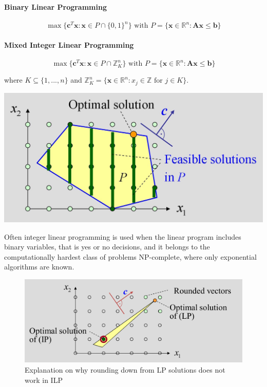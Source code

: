 \documentclass[11pt]{article}
\begin{document}
\paragraph{{\color{red}Binary} Linear Programming}
\begin{equation*}
	\max\{\textbf{c}^T \textbf{x} : \textbf{x} \in P \cap \{0,1\}^n\}\text{ with }P = \{\textbf{x} \in \mathbb{R}^n : \textbf{A}\textbf{x} \leq \textbf{b}\}
\end{equation*}

\paragraph{{\color{red}Mixed Integer} Linear Programming} 
\begin{equation*}
	\max\{\textbf{c}^T \textbf{x} : \textbf{x} \in P \cap \mathbb{Z}_K^n\}\text{ with }P = \{\textbf{x} \in \mathbb{R}^n : \textbf{A}\textbf{x} \leq \textbf{b}\}
\end{equation*}

where $K\subseteq \{1,...,n\}$ and $\mathbb{Z}_K^n=\{ \textbf{x}\in\mathbb{R}^n : x_j \in\mathbb{Z}\text{ for } j\in K \}$.

\begin{center}
	\includegraphics[width=0.7\linewidth]{img/mixed_integer_programming}
\end{center}

Often integer linear programming is used when the linear program includes binary variables, that is yes or no decisions, and it belongs to the computationally hardest class of problems NP-complete, where only exponential algorithms are known.

\begin{figure}[tbh]
	\centering
	\includegraphics[width=0.7\linewidth]{img/ilp_rounding_lp}
	\caption{Explanation on why rounding down from LP solutions does not work in ILP}
	\label{fig:ilproundinglp}
\end{figure}
\end{document}
